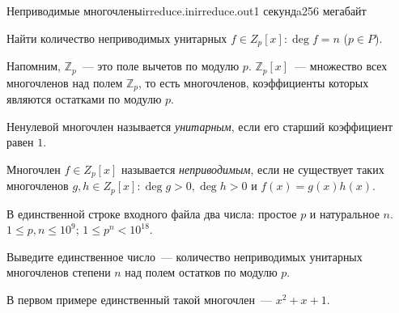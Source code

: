 \begin{problem}{Неприводимые многочлены}{irreduce.in}{irreduce.out}{1 секундa}{256 мегабайт}

Найти количество неприводимых унитарных $f\in{Z}_p[x]: \deg f=n$ ($p\in{P}$).

Напомним, $\mathbb{Z}_p$~--- это поле вычетов по модулю $p$. $\mathbb{Z}_p[x]$~--- множество всех многочленов над полем $\mathbb{Z}_p$,
то есть многочленов, коэффициенты которых являются остатками по модулю $p$.

Ненулевой многочлен называется \textit{унитарным}, если его старший коэффициент равен $1$.

Многочлен $f\in{Z}_p[x]$ называется \textit{неприводимым}, если не существует таких многочленов $g,h\in{Z}_p[x]: \deg g>0, \deg h>0$ и $f(x)=g(x)h(x)$.

\InputFile

В единственной строке входного файла два числа: простое $p$ и натуральное $n$.
$1\le p,n\le 10^9$; $1\le p^n<10^{18}$.

\OutputFile

Выведите единственное число~--- количество неприводимых унитарных многочленов степени $n$ над полем остатков по модулю $p$.

\Examples

\begin{example}
%
%
\end{example}

\begin{Note}
В первом примере единственный такой многочлен~--- $x^2+x+1$.
\end{Note}

\end{problem}

